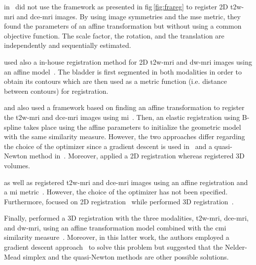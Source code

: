 \citeauthor{Ampeliotis2008} in~\cite{Ampeliotis2007,Ampeliotis2008} did not use the framework as presented in \acs{fig}\,\ref{fig:frareg} to register 2D \ac{t2w}-\ac{mri} and \ac{dce}-\ac{mri} images.
By using image symmetries and the \ac{mse} metric, they found the parameters of an affine transformation but without using a common objective function.
The scale factor, the rotation, and the translation are independently and sequentially estimated.

\citeauthor{Giannini2013} used also a in-house registration method for 2D \ac{t2w}-\ac{mri} and \ac{dw}-\ac{mri} images using an affine model~\cite{Giannini2013,giannini2015fully}.
The bladder is first segmented in both modalities in order to obtain its contours which are then used as a metric function (i.e. distance between contours) for registration.

\citeauthor{Giannini2013} and also \citeauthor{Vos2010} used a framework based on finding an affine transformation to register the \ac{t2w}-\ac{mri} and \ac{dce}-\ac{mri} images using \ac{mi}~\cite{Rueckert1999,Giannini2013,Vos2010}.
Then, an elastic registration using B-spline takes place using the affine parameters to initialize the geometric model with the same similarity measure.
However, the two approaches differ regarding the choice of the optimizer since a gradient descent is used in~\cite{Giannini2013} and a quasi-Newton method in~\cite{Vos2010}.
Moreover, \citeauthor{Giannini2013} applied a 2D registration whereas \citeauthor{Vos2010} registered 3D volumes.

\citeauthor{Viswanath2008a} as well as \citeauthor{Vos2008} registered \ac{t2w}-\ac{mri} and \ac{dce}-\ac{mri} images using an affine registration and a \ac{mi} metric~\cite{Viswanath2008a,Viswanath2009,Vos2008}.
However, the choice of the optimizer has not been specified. 
Furthermore, \citeauthor{Viswanath2008a} focused on 2D registration~\cite{Viswanath2008a,Viswanath2009} while \citeauthor{Vos2008} performed 3D registration~\cite{Vos2008}.

Finally, \citeauthor{Viswanath2011} performed a 3D registration with the three modalities, \ac{t2w}-\ac{mri}, \ac{dce}-\ac{mri}, and \ac{dw}-\ac{mri}, using an affine transformation model combined with the \ac{cmi} similarity measure~\cite{Viswanath2011}.
Moreover, in this latter work, the authors employed a gradient descent approach~\cite{Chappelow2011} to solve this problem but suggested that the Nelder-Mead simplex and the quasi-Newton methods are other possible solutions.

